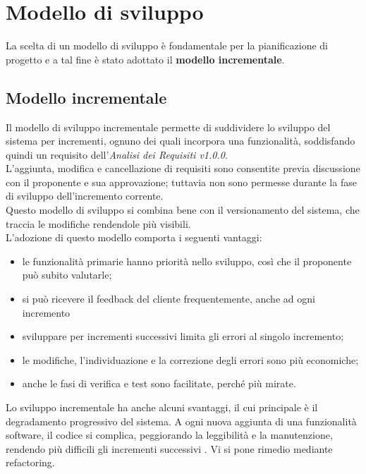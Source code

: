 \section{Modello di sviluppo}
La scelta di un modello di sviluppo è fondamentale per la pianificazione di 
progetto e a tal fine è stato adottato il \textbf{modello incrementale}.

\subsection{Modello incrementale}
Il modello di sviluppo incrementale permette di suddividere lo sviluppo del sistema per 
incrementi, ognuno dei quali incorpora una funzionalità, soddisfando quindi un requisito
dell'\textit{Analisi dei Requisiti v1.0.0}. \\
L'aggiunta, modifica e cancellazione di requisiti sono consentite previa discussione con il proponente e sua 
approvazione; tuttavia non sono permesse durante la fase di sviluppo dell'incremento corrente.\\
Questo modello di sviluppo si combina bene con il versionamento del sistema, che traccia le modifiche rendendole più visibili.\\
L'adozione di questo modello comporta i seguenti vantaggi:
\begin{itemize}
	\item le funzionalità primarie hanno priorità nello sviluppo, così che il proponente può subito valutarle;
	\item si può ricevere il feedback del cliente frequentemente, anche ad ogni incremento
	\item sviluppare per incrementi successivi limita gli errori al singolo incremento;
	\item le modifiche, l'individuazione e la correzione degli errori sono più economiche;
	\item anche le fasi di verifica e test sono facilitate, perché più mirate.
\end{itemize}
Lo sviluppo incrementale ha anche alcuni svantaggi, il cui principale è il degradamento progressivo del sistema. A ogni nuova aggiunta di una funzionalità software, il codice si complica, peggiorando la leggibilità e la manutenzione, rendendo più difficili gli incrementi successivi . Vi si pone rimedio mediante refactoring.

